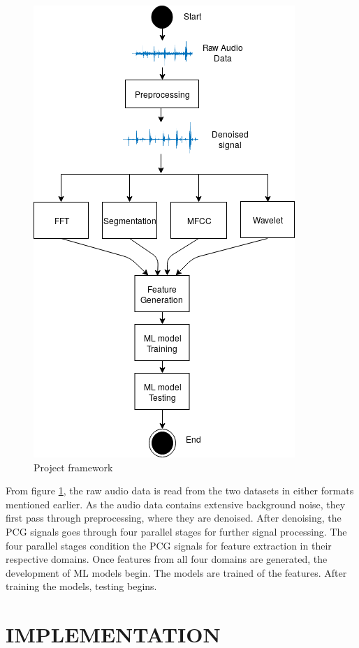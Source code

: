 \documentclass[10pt,twocolumn]{witseiepaper}
\begin{document}
\begin{figure}[h!]
    \centering
    \includegraphics[scale=0.6]{./framework2.png}
    \caption{Project framework}
    \label{fig:frame}
\end{figure}

From figure \ref{fig:frame}, the raw audio data is read from the two datasets in either formats mentioned earlier. As the audio data contains extensive background noise, they first pass through preprocessing, where they are denoised. After denoising, the PCG signals goes through four parallel stages for further signal processing. The four parallel stages condition the PCG signals for feature extraction in their respective domains. Once features from all four domains are generated, the development of ML models begin. The models are trained of the features. After training the models, testing begins.

\section{IMPLEMENTATION}
\end{document}
